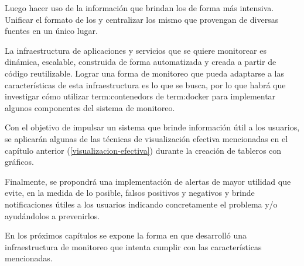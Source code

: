 Luego hacer uso de la información que brindan los  de forma más
intensiva. Unificar el formato de los  y centralizar los mismo que
provengan de diversas fuentes en un único lugar.

La infraestructura de aplicaciones y servicios que se quiere monitorear es
dinámica, escalable, construida de forma automatizada y creada a partir de
código reutilizable. Lograr una forma de monitoreo que pueda adaptarse a las
características de esta infraestructura es lo que se busca, por lo que habrá
que investigar cómo utilizar \glspl{term:contenedor} de \gls{term:docker} para
implementar algunos componentes del sistema de monitoreo.

Con el objetivo de impulsar un sistema que brinde información útil a los
usuarios, se aplicarán algunas de las técnicas de visualización efectiva
mencionadas en el capítulo anterior (\autoref{visualizacion-efectiva}) durante
la creación de tableros con gráficos.

Finalmente, se propondrá una implementación de
alertas de mayor utilidad que evite, en la medida de lo posible, falsos
positivos y negativos y brinde notificaciones útiles a los usuarios indicando
concretamente el problema y/o ayudándolos a prevenirlos.

En los próximos capítulos se expone la forma en que desarrolló una
infraestructura de monitoreo que intenta cumplir con las características
mencionadas.
